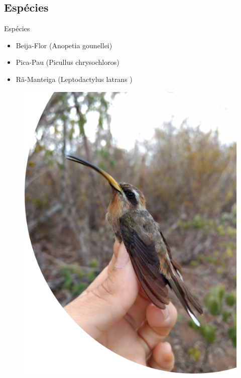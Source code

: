 \documentclass{beamer}
\begin{document}
  \subsection{Espécies}
    \begin{frame}{Espécies}
        \begin{itemize}
            \item Beija-Flor (Anopetia gounellei)
            \item Pica-Pau (Picullus chrysochloros)
            \item Rã-Manteiga (Leptodactylus latrans )
        \end{itemize}
        \begin{figure}[!h]
          \centering
          \includegraphics[scale=0.28]{bf1.png} \quad

\end{figure}
\end{frame}
\end{document}
